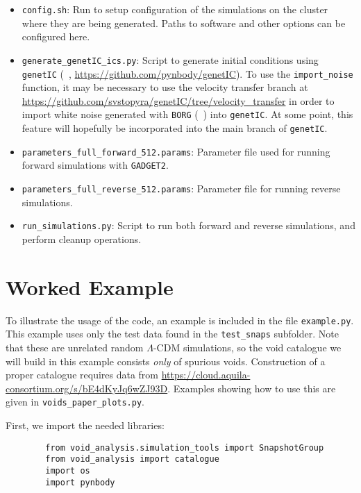 \documentclass{article}
\newcommand{\codefont}[1]{{\texttt{#1}}}
\begin{document}
	\begin{itemize}
		\item \codefont{config.sh}: Run to setup configuration of the simulations on the cluster where they are being generated. Paths to software and other options can be configured here.
		\item \codefont{generate\_genetIC\_ics.py}: Script to generate initial conditions using \codefont{genetIC} (~\citet{stopyra2021genetic}, \url{https://github.com/pynbody/genetIC}). To use the \codefont{import\_noise} function, it may be necessary to use the velocity transfer branch at \url{https://github.com/svstopyra/genetIC/tree/velocity_transfer} in order to import white noise generated with \codefont{BORG} (~\citet{jasche2019physical}) into \codefont{genetIC}. At some point, this feature will hopefully be incorporated into the main branch of \codefont{genetIC}.
		\item \codefont{parameters\_full\_forward\_512.params}: Parameter file used for running forward simulations with \codefont{GADGET2}.
		\item \codefont{parameters\_full\_reverse\_512.params}: Parameter file for running reverse simulations.
		\item \codefont{run\_simulations.py}: Script to run both forward and reverse simulations, and perform cleanup operations.
	\end{itemize}
	
	\section{Worked Example}
	\label{sec:example}
	
	To illustrate the usage of the code, an example is included in the file \codefont{example.py}. This example uses only the test data found in the \codefont{test\_snaps} subfolder. Note that these are unrelated random $\Lambda$-CDM simulations, so the void catalogue we will build in this example consists \emph{only} of spurious voids. Construction of a proper catalogue requires data from \url{https://cloud.aquila-consortium.org/s/bE4dKyJq6wZJ93D}. Examples showing how to use this are given in \codefont{voids\_paper\_plots.py}.
	
	First, we import the needed libraries:
	
	\begin{verbatim}
		from void_analysis.simulation_tools import SnapshotGroup
		from void_analysis import catalogue
		import os
		import pynbody
	\end{verbatim}
	
\end{document}
